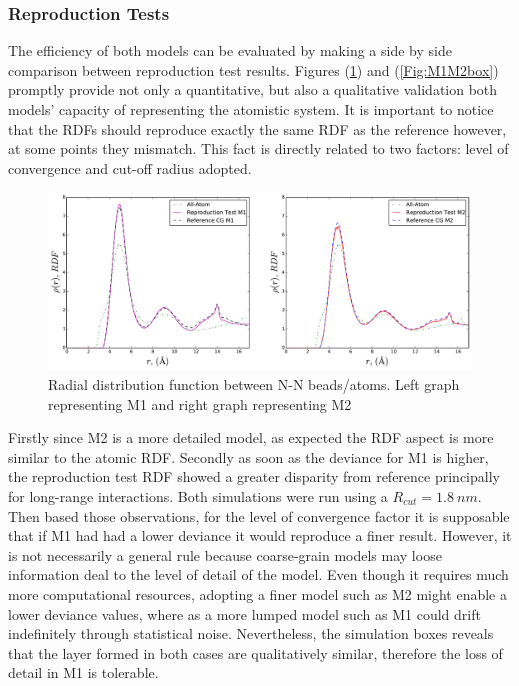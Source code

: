 \documentclass[10pt,a4paper,twoside]{article}
\begin{document}
\subsubsection{Reproduction Tests}
 The efficiency of both models can be evaluated by making a side by side comparison between reproduction test results. Figures (\ref{Fig:M1M2rdf}) and (\ref{Fig:M1M2box}) promptly provide not only a quantitative, but also a qualitative validation both models' capacity of representing the atomistic system. It is important to notice that the RDFs should reproduce exactly the same RDF as the reference however, at some points they mismatch. This fact is directly related to two factors: level of convergence and cut-off radius adopted.
     \begin{figure}[ht!]
  \begin{center}
	\includegraphics[width=1 \textwidth]{./graphs/rdfM1M2}
	\caption{Radial distribution function between N-N beads/atoms. Left graph representing M1 and right graph representing M2}
	\label{Fig:M1M2rdf}
  \end{center}
\end{figure} 

Firstly since M2 is a more detailed  model, as expected the RDF aspect is more similar to the atomic RDF. Secondly as soon as the deviance for M1 is higher, the reproduction test RDF showed a greater disparity from reference principally for long-range interactions. Both simulations were run using a $R_{cut} = 1.8 \ nm$.  Then based those observations, for the level of convergence factor it is supposable that if M1 had had a lower deviance it would reproduce a finer result. However, it is not necessarily a general rule because coarse-grain models may loose information deal to the level of detail of the model. Even though it requires much more computational resources, adopting a finer model such as M2 might enable a lower deviance values, where as a more lumped model such as M1 could drift indefinitely through statistical noise. Nevertheless, the simulation boxes reveals that the layer formed in both cases are qualitatively similar, therefore the loss of detail in M1 is tolerable.
\end{document}
